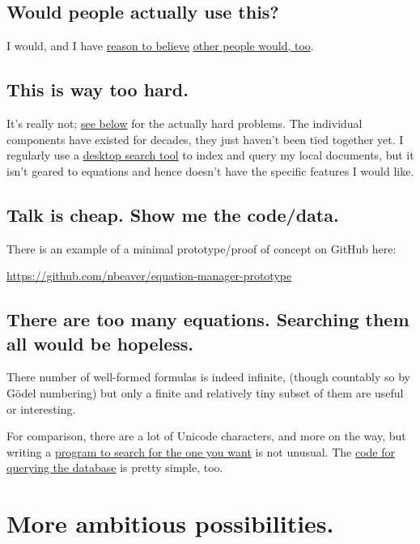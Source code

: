 \documentclass[12pt,letterpaper]{article}
\begin{document}
\subsection{Would people actually use this?}

I would, and I have
\href{http://www.researchgate.net/post/I_am_looking_for_an_equation_database_or_digital_list_of_equations}
{reason to believe}
\href{http://productforums.google.com/forum/#!topic/websearch/lVJiyCSl-xk}
{other people would, too}.

\subsection{This is way too hard.}

It's really not;
\hyperref[sec:ambitious]
{see below} for the actually hard problems.
The individual components have existed for decades,
they just haven't been tied together yet.
I regularly use a
\href{https://en.wikipedia.org/wiki/Recoll}
{desktop search tool} to index and query my local documents,
but it isn't geared to equations and hence doesn't have the specific features I would like.

\subsection{Talk is cheap. Show me the code/data.}

There is an example of a minimal prototype/proof of concept on GitHub here:

\url{https://github.com/nbeaver/equation-manager-prototype}

\subsection{There are too many equations. Searching them all would be hopeless.}

There number of well-formed formulas is indeed infinite,
(though countably so by Gödel numbering)
but only a finite and relatively tiny subset of them are useful or interesting.

For comparison,
there are a lot of Unicode characters,
and more on the way,
but writing a
\href{https://mail.python.org/pipermail/python-announce-list/2003-April/002183.html}
{program to search for the one you want} is not unusual.
The
\href{http://sources.debian.net/src/unicode/0.9.7/unicode}
{code for querying the database} is pretty simple, too.

\section{More ambitious possibilities.}\label{sec:ambitious}
\end{document}
